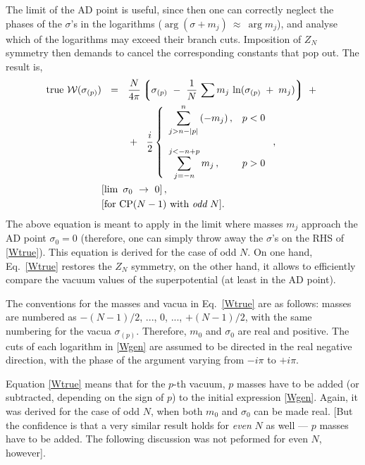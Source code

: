 \documentclass[12pt]{article}
\newcommand{\mc}[1]{\mathcal{#1}}
\newcommand{\lgr}{\left\lgroup}
\newcommand{\rgr}{\right\rgroup}
\begin{document}
The limit of the AD point is useful, since then one can correctly neglect the phases of the $ \sigma $'s in
the logarithms  ($ \arg (\sigma + m_j) ~\approx~ \arg m_j $), and analyse which of the logarithms
may exceed their branch cuts. Imposition of $Z_N$ symmetry then demands to cancel the corresponding
constants that pop out. 
The result is, 
\begin{align}
%
\notag
	\text{true}~ \mc{W}(\sigma_{(p)})  & ~~=~~ 
		\frac{N}{4\pi}  
		\lgr  \sigma_{(p)} ~-~ \frac{1}{N}\, \sum m_j\, \ln ( \sigma_{(p)} \;+\; m_j ) \rgr 
	~+~ \\
%
\label{Wtrue}
	&
\qquad
	~~+~~
	\frac{i}{2} \left\{
	\begin{array}{ll}
		  {\displaystyle \sum_{ j > n - |p|}^{n}}\,  ( -m_j)\,, &  p < 0 \\
			\\
		  {\displaystyle \sum_{j=-n}^{j<-n + p}}\,   m_j\,, &  p > 0
	\end{array}
	\right.,
	\\
%
\notag
	& [\lim~ \sigma_0~ \to~ 0]\,,  \\
%
\notag
	& [\text{for CP($N-1$) with {\it odd} $N$}].
\end{align}
The above equation is meant to apply in the limit where masses $ m_j $ approach the AD point $ \sigma_0 = 0 $
(therefore, one can simply throw away the $ \sigma $'s on the RHS of \eqref{Wtrue}).
This equation is derived for the case of odd $N$.
On one hand, Eq.~\eqref{Wtrue} restores the $ Z_N $ symmetry, on the other hand, it allows to efficiently
compare the vacuum values of the superpotential (at least in the AD point).

The conventions for the masses and vacua in Eq.~\eqref{Wtrue} are as follows: masses are numbered as
$ -(N-1)/2$, ..., $0$, ..., $+(N-1)/2 $, with the same numbering for the vacua $ \sigma_{(p)} $. Therefore,
$ m_0 $ and $ \sigma_0 $ are real and positive. The cuts of each logarithm in \eqref{Wgen} are assumed to
be directed in the real negative direction, with the phase of the argument varying from 
$ - i \pi $ to $ + i \pi $.


Equation \eqref{Wtrue} means that for the $p$-th vacuum, $ p $ masses have to be added 
(or subtracted, depending on the sign of $p$) to the initial expression \eqref{Wgen}. 
Again, it was derived for the case of odd $N$, when both $ m_0 $ and $ \sigma_0 $ can be made real.
[But the confidence is that a very similar result holds for {\it even} $N$ as well --- $ p $
masses have to be added. The following discussion was not peformed for even $N$, however].
\end{document}
